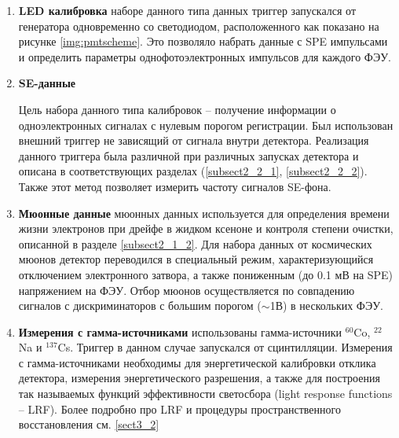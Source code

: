  \begin{enumerate}
     \item\textbf{LED калибровка}
     наборе данного типа данных триггер запускался от генератора одновременно со светодиодом, расположенного как показано на рисунке \ref{img:pmtscheme}. Это позволяло набрать данные с SPE импульсами и определить параметры однофотоэлектронных импульсов для каждого ФЭУ.
	 \item\textbf{SE-данные}
	\par Цель набора данного типа калибровок -- получение информации о одноэлектронных сигналах с нулевым порогом регистрации. Был использован внешний триггер не зависящий от сигнала внутри детектора. Реализация данного триггера была различной при различных запусках детектора и описана в соответствующих разделах (\ref{subsect2_2_1}, \ref{subsect2_2_2}). Также этот метод позволяет измерить частоту сигналов SE-фона.
	 \item\textbf{Мюонные данные}
	 мюонных данных используется для определения времени жизни электронов при дрейфе в жидком ксеноне и контроля степени очистки, описанной в разделе \ref{subsect2_1_2}. Для набора данных от космических мюонов детектор переводился в специальный режим, характеризующийся отключением электронного затвора, а также пониженным (до 0.1 мВ на SPE) напряжением на ФЭУ. Отбор мюонов осуществляется по совпадению сигналов с дискриминаторов с большим порогом ($\sim$1В) в нескольких ФЭУ. 
	 \item\textbf{Измерения с гамма-источниками}
	 использованы гамма-источники $^{60}$Co, $^{22}$Na и $^{137}$Cs. Триггер в данном случае запускался от сцинтилляции. Измерения с гамма-источниками необходимы для энергетической калибровки отклика детектора, измерения энергетического разрешения, а также для построения так называемых функций эффективности светосбора (light response functions -- LRF). Более подробно про LRF и процедуры пространственного восстановления см. \ref{sect3_2}
\end{enumerate}


